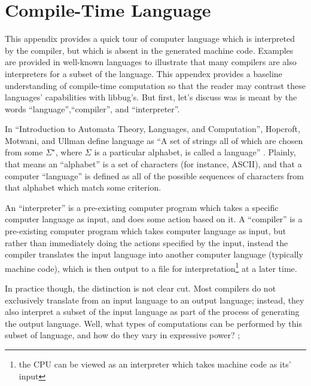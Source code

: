 
\appendix
 \appendixpage
 \noappendicestocpagenum
 \chapter{Compile-Time Language}
  \label{sec:appendix1}
 This appendix provides a quick tour of computer language which is interpreted
 by the compiler, but which is absent in the generated machine
 code.  Examples are provided in well-known languages to illustrate that
 many compilers are also interpreters for a subset of the language.  This
 appendex provides a baseline understanding of compile-time computation
 so that the reader may contrast these languages' capabilities with libbug's.
 But first, let's discuss was is meant by the words ``language'',``compiler'', and
 ``interpreter''.

 In ``Introduction to Automata Theory, Languages, and Computation'', Hopcroft,
 Motwani, and Ullman define language as ``A set of strings all of which are chosen
 from some $\Sigma^{\star}$, where $\Sigma$ is a particular alphabet, is called
 a language'' \cite[p. 30]{hmu2001}.
 Plainly, that means an ``alphabet'' is a set of characters (for instance, ASCII), and
 that a computer ``language'' is defined as all of the possible sequences of characters
 from that alphabet which match some criterion.

 An ``interpreter'' is a pre-existing computer program which takes a specific
 computer language as input,
 and does some action based on it.  A ``compiler'' is a pre-existing computer program
 which takes computer language as input,
 but rather than immediately doing the actions specified by the input, instead the compiler
 translates the input language
 into another computer language (typically machine code), which is then output to a file
 for interpretation\footnote{the CPU can be viewed as an
 interpreter which takes machine code as its' input} at a later time.

 In practice though, the distinction is not clear cut.  Most compilers do not exclusively
 translate from an input language
 to an output language; instead, they also interpret a subset of the input
 language as part of the process of generating the output language.  Well, what
 types of computations can be performed by this subset of language, and how do
 they vary in expressive power?
;
